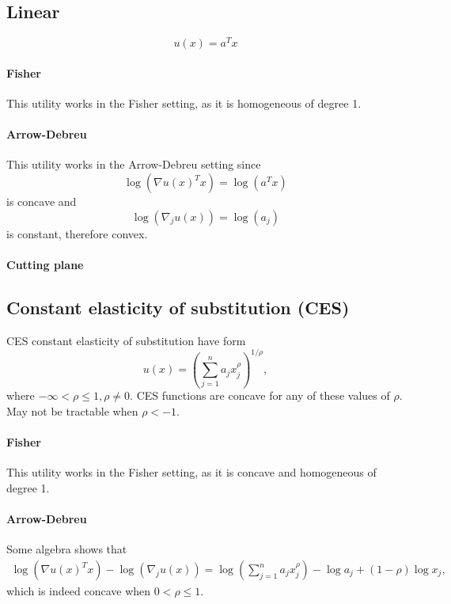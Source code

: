 \documentclass{article}
\begin{document}
\subsection{Linear}
\[
u(x) = a^T x
\]
\paragraph{Fisher}
This utility works in the Fisher setting, as it is homogeneous of degree 1.
\paragraph{Arrow-Debreu}
This utility works in the Arrow-Debreu setting since
\[
\log(\nabla u(x)^T x) = \log(a^T x)
\]
is concave and
\[
\log(\nabla_j u(x)) = \log(a_j)
\]
is constant, therefore convex.

\paragraph{Cutting plane}

\subsection{Constant elasticity of substitution (CES)}
CES constant elasticity of substitution have form
\[
u(x) = \left(\sum_{j=1}^n a_j x_j^\rho \right)^{1/\rho},
\]
where $-\infty < \rho \leq 1, \rho \neq 0$.
CES functions are concave for any of these values of $\rho$.
May not be tractable when $\rho < -1$.

\paragraph{Fisher}
This utility works in the Fisher setting, as it is concave and homogeneous of degree 1.

\paragraph{Arrow-Debreu}
Some algebra shows that 
\begin{align*}
\log(\nabla u(x)^T x) - \log(\nabla_j u(x)) =
\log\left(\sum_{j=1}^n a_j x_j^\rho \right) - \log a_j + (1-\rho) \log x_j,
\end{align*}
which is indeed concave when $0 < \rho \leq 1$.

\end{document}
